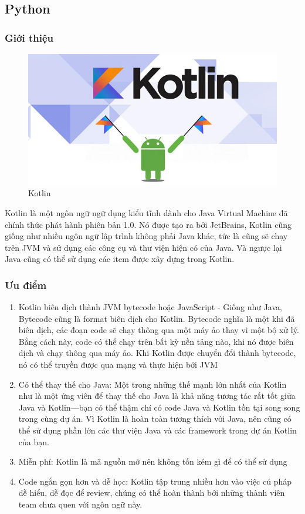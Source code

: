 \subsection{Python}
    \subsubsection{Giới thiệu}
        \begin{figure}[h]
            \centering
            \includegraphics[width=0.99\linewidth]{images/appropriate framework/kotin.jpg}
            \caption{Kotlin}
        \end{figure}
        Kotlin là một ngôn ngữ ngữ dụng kiểu tĩnh dành cho Java Virtual Machine đã chính thức phát hành phiên bản 1.0. Nó được tạo ra bởi JetBrains, Kotlin cũng giống như nhiều ngôn ngữ lập trình không phải Java khác, tức là cũng sẽ chạy trên JVM và sử dụng các công cụ và thư viện hiện có của Java. Và ngược lại Java cũng có thể sử dụng các item được xây dựng trong Kotlin.
    \subsubsection{Ưu điểm}
        \begin{enumerate}
            \item Kotlin biên dịch thành JVM bytecode hoặc JavaScript - Giống như Java, Bytecode cũng là format biên dịch cho Kotlin. Bytecode nghĩa là một khi đã biên dịch, các đoạn code sẽ chạy thông qua một máy ảo thay vì một bộ xử lý. Bằng cách này, code có thể chạy trên bất kỳ nền tảng nào, khi nó được biên dịch và chạy thông qua máy ảo. Khi Kotlin được chuyển đổi thành bytecode, nó có thể truyền được qua mạng và thực hiện bởi JVM
            \item Có thể thay thế cho Java: Một trong những thế mạnh lớn nhất của Kotlin như là một ứng viên để thay thế cho Java là khả năng tương tác rất tốt giữa Java và Kotlin—bạn có thể thậm chí có code Java và Kotlin tồn tại song song trong cùng dự án. Vì Kotlin là hoàn toàn tương thích với Java, nên cũng có thể sử dụng phần lớn các thư viện Java và các framework trong dự án Kotlin của bạn.
            \item Miễn phí: Kotlin là mã nguồn mở nên không tốn kém gì để có thể sử dụng
            \item Code ngắn gọn hơn và dễ học: Kotlin tập trung nhiều hơn vào việc cú pháp dễ hiểu, dễ đọc để review, chúng có thể hoàn thành bởi những thành viên team chưa quen với ngôn ngữ này.
        \end{enumerate}
